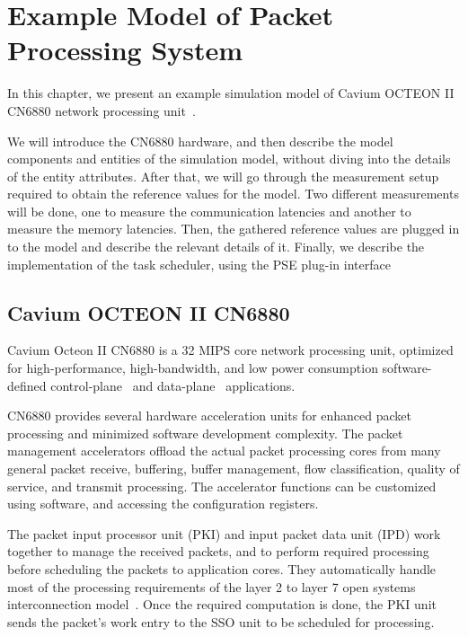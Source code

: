 \chapter{Example Model of Packet Processing System}
\label{chapter:example-simulation-model}

In this chapter, we present an example simulation model of Cavium OCTEON II CN6880 network processing unit~\cite{Cavium OCTEON}.

We will introduce the CN6880 hardware, and then describe the model components and entities of the simulation model, without diving into the details of the entity attributes. After that, we will go through the measurement setup required to obtain the reference values for the model. Two different measurements will be done, one to measure the communication latencies and another to measure the memory latencies. Then, the gathered reference values are plugged in to the model and describe the relevant details of it. Finally, we describe the implementation of the task scheduler, using the PSE plug-in interface

\section{Cavium OCTEON II CN6880}
\label{sec:cavium-octeon}

Cavium Octeon II CN6880 is a 32 MIPS core network processing unit, optimized for high-performance, high-bandwidth, and low power consumption software-defined control-plane~\cite{control-plane} and data-plane~\cite{data-plane} applications.

CN6880 provides several hardware acceleration units for enhanced packet processing and minimized software development complexity. The packet management accelerators offload the actual packet processing cores from many general packet receive, buffering, buffer management, flow classification, quality of service, and transmit processing. The accelerator functions can be customized using software, and accessing the configuration registers.~\cite{cavium:2010:fundamentals}

The packet input processor unit (PKI) and input packet data unit (IPD) work together to manage the received packets, and to perform required processing before scheduling the packets to application cores. They automatically handle most of the processing requirements of the layer 2 to layer 7 open systems interconnection model~\cite{OSI model}. Once the required computation is done, the PKI unit sends the packet's work entry to the SSO unit to be scheduled for processing.~\cite{cavium:2010:fundamentals}

